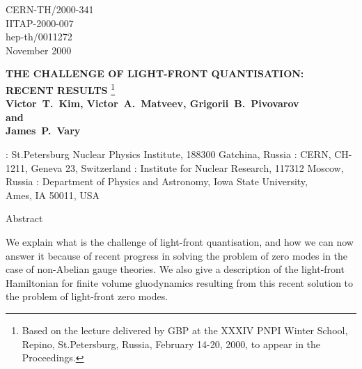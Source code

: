\documentclass[a4paper,12pt]{article}
\begin{document}
\begin{flushright}
CERN-TH/2000-341 \\
IITAP-2000-007 \\
hep-th/0011272 \\
November  2000
\end{flushright}
\vspace*{0.7cm}
\begin{center}
{\bf THE CHALLENGE OF LIGHT-FRONT QUANTISATION: \\
RECENT RESULTS}
\footnote{Based on the lecture delivered by GBP at 
the XXXIV PNPI Winter School, Repino, St.Petersburg, Russia, 
February 14-20, 2000, to appear in the Proceedings.}\\ 
\vspace*{1cm}
{ \bf Victor~T.~Kim\myHighlight{${}^{\ddagger \&}$}\coordHE{}, Victor~A.~Matveev\myHighlight{${}^{\S}$}\coordHE{},
Grigorii~B.~Pivovarov\myHighlight{${}^{\S }$}\coordHE{} \\
{\rm and} \\
James~P.~Vary\myHighlight{${}^{\dagger}$}\coordHE{}}  \\
\vspace*{0.7cm}
\end{center}
\myHighlight{${}^\ddagger$}\coordHE{} : St.Petersburg Nuclear Physics Institute,
188300 Gatchina, Russia
\newline
\myHighlight{${}^\&$}\coordHE{} : CERN, CH-1211, Geneva 23, Switzerland
\newline
\myHighlight{${}^\S$}\coordHE{} : Institute for Nuclear Research, 117312 Moscow, Russia
\newline
\myHighlight{${}^\dagger$}\coordHE{} : Department of Physics and Astronomy,
Iowa State University, \\ 
\hspace*{0.45cm} Ames, IA 50011, USA


\begin{center}
Abstract
\end{center}

We explain what is the challenge of light-front quantisation, 
and how we can now answer it because of recent progress 
in solving the problem of zero modes in the case of non-Abelian 
gauge theories. We also give a description of the 
light-front Hamiltonian for \coordHE{} finite volume gluodynamics 
resulting from this recent solution to the problem of 
light-front zero modes.


\vspace{1cm}
\newpage
\end{document}
